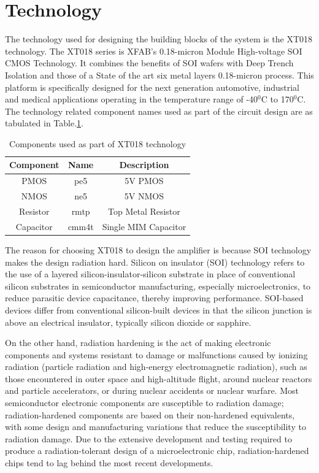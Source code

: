 \vfill
\clearpage

\section{Technology}

The technology used for designing the building blocks of the system is the XT018 technology. The XT018 series is XFAB's 0.18-micron Module High-voltage SOI CMOS Technology. It combines the benefits of SOI wafers with Deep Trench Isolation and those of a State of the art six metal layers 0.18-micron process. This platform is specifically designed for the next generation automotive, industrial and medical applications operating in the temperature range of -40$^0$C to 170$^0$C. The technology related component names used as part of the circuit design are as tabulated in Table.\ref{tab:Components}.

\begin{table} [H]
\centering
\begin{tabular}{@{}ccc@{}}
\toprule
Component	& Name		& Description			\\ \midrule
PMOS		& pe5		& 5V PMOS				\\
NMOS		& ne5		& 5V NMOS				\\
Resistor	& rmtp		& Top Metal Resistor	\\
Capacitor	& cmm4t		& Single MIM Capacitor	\\
\bottomrule
\end{tabular}
\caption{Components used as part of XT018 technology}
\label{tab:Components}
\end{table}

The reason for choosing XT018 to design the amplifier is because SOI technology makes the design radiation hard. Silicon on insulator (SOI) technology refers to the use of a layered silicon-insulator-silicon substrate in place of conventional silicon substrates in semiconductor manufacturing, especially microelectronics, to reduce parasitic device capacitance, thereby improving performance. SOI-based devices differ from conventional silicon-built devices in that the silicon junction is above an electrical insulator, typically silicon dioxide or sapphire. 

On the other hand, radiation hardening is the act of making electronic components and systems resistant to damage or malfunctions caused by ionizing radiation (particle radiation and high-energy electromagnetic radiation), such as those encountered in outer space and high-altitude flight, around nuclear reactors and particle accelerators, or during nuclear accidents or nuclear warfare. Most semiconductor electronic components are susceptible to radiation damage; radiation-hardened components are based on their non-hardened equivalents, with some design and manufacturing variations that reduce the susceptibility to radiation damage. Due to the extensive development and testing required to produce a radiation-tolerant design of a microelectronic chip, radiation-hardened chips tend to lag behind the most recent developments.